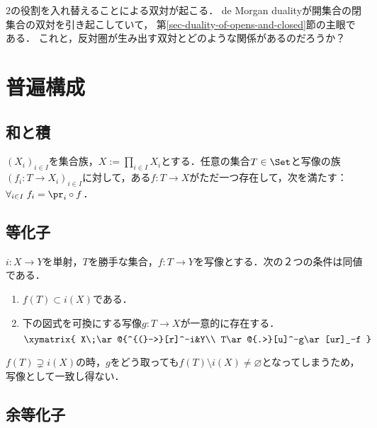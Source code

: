 \documentclass[uplatex,dvipdfmx]{jsreport}
\begin{document}
$2$の役割を入れ替えることによる双対が起こる．
de Morgan dualityが開集合の閉集合の双対を引き起こしていて，
第\ref{sec-duality-of-opens-and-closed}節の主眼である．
これと，反対圏が生み出す双対とどのような関係があるのだろうか？

\section{普遍構成}

\subsection{和と積}

\begin{proposition}[積の普遍性]
    $(X_i)_{i\in I}$を集合族，$X:=\prod_{i\in I}X_i$とする．任意の集合$T\in\Set$と写像の族$(f_i:T\to X_i)_{i\in I}$に対して，ある$f:T\to X$がただ一つ存在して，次を満たす：$\forall_{i\in I}\;f_i=\pr_i\circ f$．
\end{proposition}

\subsection{等化子}

\begin{proposition}
    $i:X\to Y$を単射，$T$を勝手な集合，$f:T\to Y$を写像とする．次の２つの条件は同値である．
    \begin{enumerate}
        \item $f(T)\subset i(X)$である．
        \item 下の図式を可換にする写像$g:T\to X$が一意的に存在する．
        \[\xymatrix{
            X\;\ar@{^{(}->}[r]^-i&Y\\
            T\ar@{.>}[u]^-g\ar[ur]_-f
        }\]
    \end{enumerate}
\end{proposition}
\begin{remarks}
    $f(T)\supsetneq i(X)$の時，$g$をどう取っても$f(T)\setminus i(X)\ne\varnothing$となってしまうため，写像として一致し得ない．
\end{remarks}

\subsection{余等化子}
\end{document}
